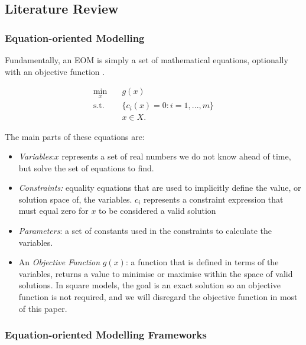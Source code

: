 \hypertarget{literature-review}{%
\subsection{Literature Review}\label{literature-review}}

\hypertarget{equation-oriented-modelling}{%
\subsubsection{Equation-oriented
Modelling}\label{equation-oriented-modelling}}

Fundamentally, an EOM is simply a set of mathematical equations,
optionally with an objective function \citep{biegler2010nonlinear}.

\[
\begin{aligned}
\min_{x} \quad & g(x) \\
\text{s.t.} \quad 
& \{c_i(x) = 0 : i = 1,...,m\} \\
& x \in X.
\end{aligned}
\]

The main parts of these equations are:

\begin{itemize}
\tightlist
\item
  \emph{Variables}:\(x\) represents a set of real numbers we do not know
  ahead of time, but solve the set of equations to find.
\item
  \emph{Constraints:} equality equations that are used to implicitly
  define the value, or solution space of, the variables. \(c_i\)
  represents a constraint expression that must equal zero for \(x\) to
  be considered a valid solution
\item
  \emph{Parameters}: a set of constants used in the constraints to
  calculate the variables.
\item
  An \emph{Objective Function} \(g(x)\): a function that is defined in
  terms of the variables, returns a value to minimise or maximise within
  the space of valid solutions. In square models, the goal is an exact
  solution so an objective function is not required, and we will
  disregard the objective function in most of this paper.
\end{itemize}

\hypertarget{equation-oriented-modelling-frameworks}{%
\subsubsection{Equation-oriented Modelling
Frameworks}\label{equation-oriented-modelling-frameworks}}

